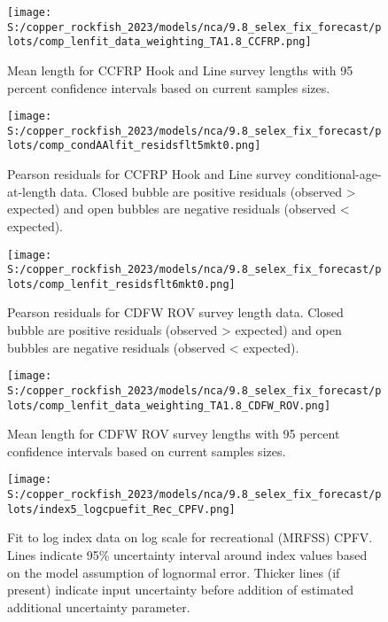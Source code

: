 \documentclass[11pt,
  english,
  letterpaper,
]{article}
\begin{document}
\pagebreak

\begin{figure}
\centering
\texttt{[image: S:/copper\_rockfish\_2023/models/nca/9.8\_selex\_fix\_forecast/plots/comp\_lenfit\_data\_weighting\_TA1.8\_CCFRP.png]}
\caption{Mean length for CCFRP Hook and Line survey lengths with 95 percent confidence intervals based on current samples sizes.\label{fig:ccfrp-mean-len-fit}}
\end{figure}

\pagebreak

\begin{figure}
\centering
\texttt{[image: S:/copper\_rockfish\_2023/models/nca/9.8\_selex\_fix\_forecast/plots/comp\_condAAlfit\_residsflt5mkt0.png]}
\caption{Pearson residuals for CCFRP Hook and Line survey conditional-age-at-length data. Closed bubble are positive residuals (observed \textgreater{} expected) and open bubbles are negative residuals (observed \textless{} expected).\label{fig:ccfrp-age-pearson}}
\end{figure}

\pagebreak

\begin{figure}
\centering
\texttt{[image: S:/copper\_rockfish\_2023/models/nca/9.8\_selex\_fix\_forecast/plots/comp\_lenfit\_residsflt6mkt0.png]}
\caption{Pearson residuals for CDFW ROV survey length data. Closed bubble are positive residuals (observed \textgreater{} expected) and open bubbles are negative residuals (observed \textless{} expected).\label{fig:rov-pearson}}
\end{figure}

\pagebreak

\begin{figure}
\centering
\texttt{[image: S:/copper\_rockfish\_2023/models/nca/9.8\_selex\_fix\_forecast/plots/comp\_lenfit\_data\_weighting\_TA1.8\_CDFW\_ROV.png]}
\caption{Mean length for CDFW ROV survey lengths with 95 percent confidence intervals based on current samples sizes.\label{fig:rov-mean-len-fit}}
\end{figure}

\pagebreak

\begin{figure}
\centering
\texttt{[image: S:/copper\_rockfish\_2023/models/nca/9.8\_selex\_fix\_forecast/plots/index5\_logcpuefit\_Rec\_CPFV.png]}
\caption{Fit to log index data on log scale for recreational (MRFSS) CPFV. Lines indicate 95\% uncertainty interval around index values based on the model assumption of lognormal error. Thicker lines (if present) indicate input uncertainty before addition of estimated additional uncertainty parameter.\label{fig:mrfss-cpfv-index-fit}}
\end{figure}
\end{document}
